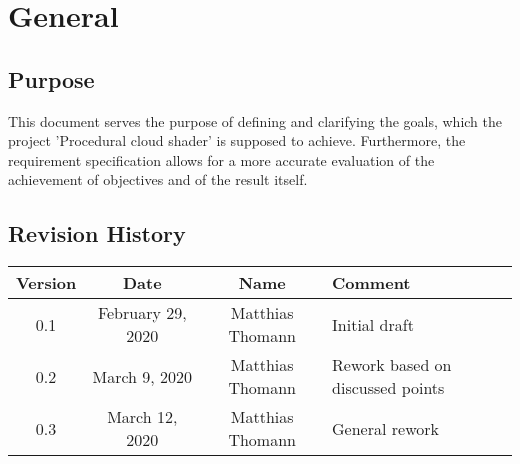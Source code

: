 \section{General}

\subsection{Purpose}
This document serves the purpose of defining and clarifying the goals, which the project 'Procedural cloud shader' is supposed to achieve. Furthermore, the requirement specification allows for a more accurate evaluation of the achievement of objectives and of the result itself.

\subsection{Revision History}

\begin{tabularx}{\textwidth}{|c|c|c|X|}
    \hline
    \textbf{Version} & \textbf{Date} & \textbf{Name} & \textbf{Comment} \\ \hline
    0.1 & February 29, 2020 & Matthias Thomann & Initial draft \\ \hline
    0.2 & March 9, 2020 & Matthias Thomann & Rework based on discussed points \\ \hline
    0.3 & March 12, 2020 & Matthias Thomann & General rework \\ \hline
\end{tabularx}